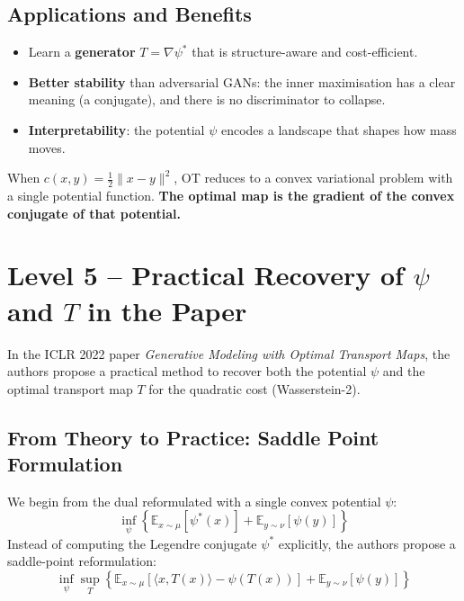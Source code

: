 \documentclass[11pt]{article}
\begin{document}
\subsection*{Applications and Benefits}
\begin{itemize}
  \item Learn a \textbf{generator} $T = \nabla \psi^*$ that is structure-aware and cost-efficient.
  \item \textbf{Better stability} than adversarial GANs: the inner maximisation has a clear meaning (a conjugate), and there is no discriminator to collapse.
  \item \textbf{Interpretability}: the potential $\psi$ encodes a landscape that shapes how mass moves.
\end{itemize}

\begin{tcolorbox}[colback=blue!3!white, colframe=blue!80!black, title=Summary]
When $c(x,y) = \frac{1}{2}\|x - y\|^2$, OT reduces to a convex variational problem with a single potential function.
\textbf{The optimal map is the gradient of the convex conjugate of that potential.}
\end{tcolorbox}



\newpage
{}
\section*{Level 5 – Practical Recovery of $\psi$ and $T$ in the Paper}

In the ICLR 2022 paper \textit{Generative Modeling with Optimal Transport Maps}, the authors propose a practical method to recover both the potential $\psi$ and the optimal transport map $T$ for the quadratic cost (Wasserstein-2).

\subsection*{From Theory to Practice: Saddle Point Formulation}

We begin from the dual reformulated with a single convex potential $\psi$:
\[
\inf_{\psi} \left\{ \mathbb{E}_{x \sim \mu} \left[ \psi^*(x) \right] + \mathbb{E}_{y \sim \nu} \left[ \psi(y) \right] \right\}
\]
Instead of computing the Legendre conjugate $\psi^*$ explicitly, the authors propose a saddle-point reformulation:
\[
\inf_{\psi} \sup_{T} \left\{ \mathbb{E}_{x \sim \mu} \left[ \langle x, T(x) \rangle - \psi(T(x)) \right] + \mathbb{E}_{y \sim \nu} \left[ \psi(y) \right] \right\}
\]
\end{document}
